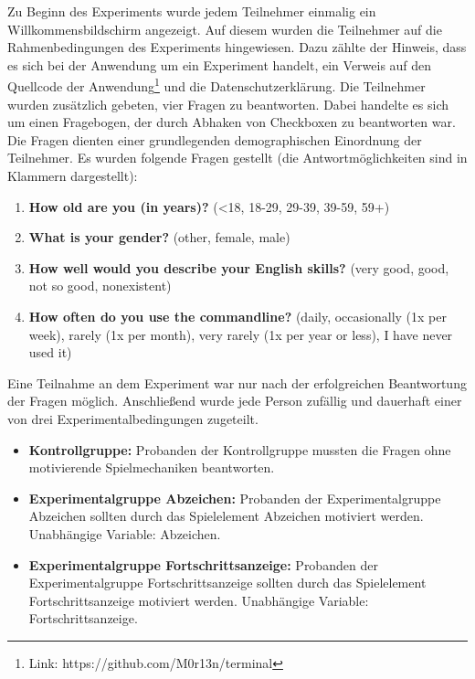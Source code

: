 Zu Beginn des Experiments wurde jedem Teilnehmer einmalig ein Willkommensbildschirm angezeigt. Auf diesem wurden die Teilnehmer auf die Rahmenbedingungen des Experiments hingewiesen. Dazu zählte der Hinweis, dass es sich bei der Anwendung um ein Experiment handelt, ein Verweis auf den Quellcode der Anwendung\footnote{Link: https://github.com/M0r13n/terminal} und die Datenschutzerklärung. Die Teilnehmer wurden zusätzlich gebeten, vier Fragen zu beantworten. Dabei handelte es sich um einen Fragebogen, der durch Abhaken von Checkboxen zu beantworten war. Die Fragen dienten einer grundlegenden demographischen Einordnung der Teilnehmer. Es wurden folgende Fragen gestellt (die Antwortmöglichkeiten sind in Klammern dargestellt):

\begin{enumerate}\label{demography}
	 \item \textbf{How old are you (in years)?} (<18, 18-29, 29-39, 39-59, 59+)
     \item \textbf{What is your gender?} (other, female, male)
     \item \textbf{How well would you describe your English skills?} (very good, good, not so good, nonexistent)
     \item \textbf{How often do you use the commandline?} (daily, occasionally (1x per week), rarely (1x per month), very rarely (1x per year or less), I have never used it)
\end{enumerate}

Eine Teilnahme an dem Experiment war nur nach der erfolgreichen Beantwortung der Fragen möglich. Anschließend wurde jede Person zufällig und dauerhaft einer von drei Experimentalbedingungen  zugeteilt.


\begin{itemize}
	 \item \textbf{Kontrollgruppe:} Probanden der Kontrollgruppe mussten die Fragen ohne motivierende Spielmechaniken beantworten.
	 
    \item \textbf{Experimentalgruppe Abzeichen:} Probanden der Experimentalgruppe Abzeichen sollten durch das Spielelement Abzeichen motiviert werden. Unabhängige Variable: Abzeichen.

    \item \textbf{Experimentalgruppe Fortschrittsanzeige:} Probanden der Experimentalgruppe Fortschrittsanzeige sollten durch das Spielelement Fortschrittsanzeige motiviert werden. Unabhängige Variable: Fortschrittsanzeige.
\end{itemize}

